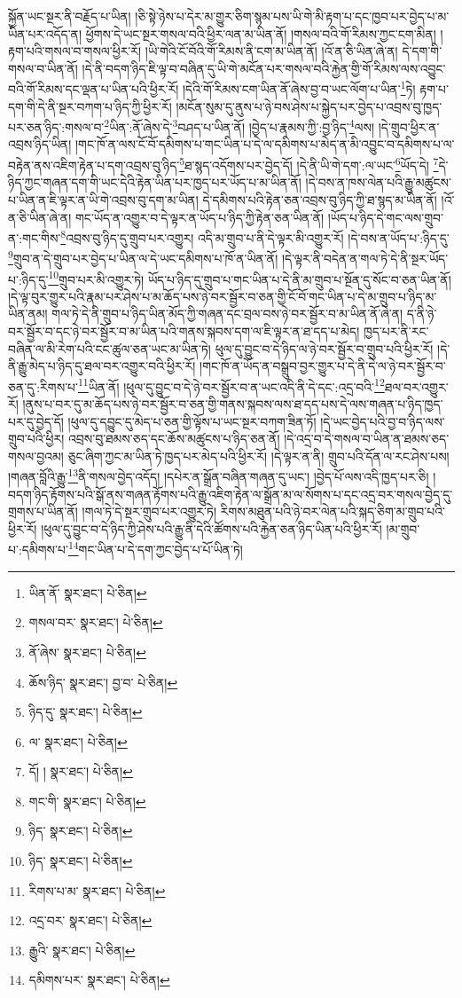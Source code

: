 སྐྱོན་ཡང་སྔར་ནི་བརྗོད་པ་ཡིན། །ཅི་སྟེ་ཉེས་པ་དེར་མ་གྱུར་ཅིག་སྙམ་པས་ཡི་གེ་མི་རྟག་པ་དང་ཁྱབ་པར་བྱེད་པ་མ་ཡིན་པར་འདོད་ན། ཕྱོགས་དེ་ཡང་སྔར་གསལ་བའི་ཕྱིར་ལན་མ་ཡིན་ནོ། །གསལ་བའི་གོ་རིམས་ཀྱང་ངག་མིན། །རྟག་པའི་གསལ་བ་གསལ་ཕྱིར་རོ། །ཡི་གེའི་ངོ་བོའི་གོ་རིམས་ནི་ངག་མ་ཡིན་ནོ། །འོ་ན་ཅི་ཡིན་ཞེ་ན། དེ་དག་གི་གསལ་བ་ཡིན་ནོ། །དེ་ནི་བདག་ཉིད་ཇི་ལྟ་བ་བཞིན་དུ་ཡི་གེ་མངོན་པར་གསལ་བའི་རྐྱེན་གྱི་གོ་རིམས་ལས་འབྱུང་བའི་གོ་རིམས་དང་ལྡན་པ་ཡིན་པའི་ཕྱིར་རོ། །དེའི་གོ་རིམས་ངག་ཡིན་ནོ་ཞེས་བྱ་བ་ཡང་ལོག་པ་ཡིན་\footnote{ཡིན་ནོ་  སྣར་ཐང་།  པེ་ཅིན། }ཏེ། རྟག་པ་དག་གི་དེ་ནི་སྔར་བཀག་པ་ཉིད་ཀྱི་ཕྱིར་རོ། །མངོན་སུམ་དུ་ནུས་པ་ཉེ་བས་ཤེས་པ་སྐྱེད་པར་བྱེད་པ་འབྲས་བུ་ཁྱད་པར་ཅན་ཉིད་:གསལ་བ་\footnote{གསལ་བར་  སྣར་ཐང་།  པེ་ཅིན། }ཡིན་:ནོ་ཞེས་དེ་\footnote{ནོ་ཞེས་  སྣར་ཐང་།  པེ་ཅིན། }བཤད་པ་ཡིན་ནོ། །བྱེད་པ་རྣམས་ཀྱི་:བྱ་ཉིད་\footnote{ཆོས་ཉིད་  སྣར་ཐང་། བྱ་བ་  པེ་ཅིན། }ལས། །དེ་གྲུབ་ཕྱིར་ན་འབྲས་ཉིད་ཡིན། །གང་ཁོ་ན་ལས་ངོ་བོ་དམིགས་པ་གང་ཡིན་པ་དེ་ལ་དམིགས་པ་མེད་ན་མི་འབྱུང་བ་དམིགས་པ་ལ་བརྟེན་ནས་འཇིག་རྟེན་པ་དག་འབྲས་བུ་ཉིད་\footnote{ཉིད་དུ་  སྣར་ཐང་།  པེ་ཅིན། }ཐ་སྙད་འདོགས་པར་བྱེད་དོ། །དེ་ནི་ཡི་གེ་དག་:ལ་ཡང་\footnote{ལ་  སྣར་ཐང་།  པེ་ཅིན། }ཡོད་དེ། \footnote{དོ། །   སྣར་ཐང་།  པེ་ཅིན། }དེ་ཉིད་ཀྱང་གཞན་དག་གི་ཡང་དེའི་རྟེན་ཡིན་པར་ཁྱད་པར་ཡོད་པ་མ་ཡིན་ནོ། །དེ་བས་ན་ཁས་ལེན་པའི་རྒྱུ་མཚུངས་པ་ཡིན་ན་ཇི་ལྟར་ན་ཡི་གེ་འབྲས་བུ་དག་མ་ཡིན། དེ་དམིགས་པའི་རྟེན་ཅན་འབྲས་བུ་ཉིད་ཀྱི་ཐ་སྙད་མ་ཡིན་ནོ། །འོ་ན་ཅི་ཡིན་ཞེ་ན། གང་ཡོད་ན་འགྱུར་བ་དེ་ལྟར་ན་ཡོད་པ་ཉིད་ཀྱི་རྟེན་ཅན་ཡིན་ནོ། །ཡོད་པ་ཉིད་དེ་གང་ལས་གྲུབ་ན་:གང་གིས་\footnote{གང་གི་  སྣར་ཐང་།  པེ་ཅིན། }འབྲས་བུ་ཉིད་དུ་གྲུབ་པར་འགྱུར། འདི་མ་གྲུབ་པ་ནི་དེ་ལྟར་མི་འགྱུར་རོ། །དེ་བས་ན་ཡོད་པ་:ཉིད་དུ་\footnote{ཉིད་  སྣར་ཐང་།  པེ་ཅིན། }གྲུབ་ན་དེ་གྲུབ་པར་བྱེད་པ་ཡིན་ལ་དེ་ཡང་དམིགས་པ་ཁོ་ན་ཡིན་ནོ། །དེ་ལྟར་ནི་བདེན་ན་གལ་ཏེ་དེ་ནི་སྔར་ཡོད་པ་:ཉིད་དུ་\footnote{ཉིད་  སྣར་ཐང་།  པེ་ཅིན། }གྲུབ་པར་མི་འགྱུར་ཏེ། ཡོད་པ་ཉིད་དུ་གྲུབ་པ་གང་ཡིན་པ་དེ་ནི་མ་གྲུབ་པ་སྔོན་དུ་སོང་བ་ཅན་ཡིན་ནོ། །དེ་ལྟ་བུར་གྱུར་པའི་རྣམ་པར་ཤེས་པ་མ་ཆོད་པས་ཉེ་བར་སྦྱོར་བ་ཅན་གྱི་ངོ་བོ་གང་ཡིན་པ་དེ་མ་གྲུབ་པ་ཉིད་མ་ཡིན་ནམ། གལ་ཏེ་དེ་ནི་གྲུབ་པ་ཉིད་ཡིན་མོད་ཀྱི་གཞན་དང་བྲལ་བས་ཉེ་བར་སྦྱོར་བ་མ་ཡིན་ནོ་ཞེ་ན། ད་ནི་ཉེ་བར་སྦྱོར་བ་དང་ཉེ་བར་སྦྱོར་བ་མ་ཡིན་པའི་གནས་སྐབས་དག་ལ་ཇི་ལྟར་ན་ཐ་དད་པ་མེད། ཁྱད་པར་ནི་རང་བཞིན་ལ་མི་རེག་པའི་ངང་ཚུལ་ཅན་ཡང་མ་ཡིན་ཏེ། ཕུལ་དུ་བྱུང་བ་དེ་ཉིད་ལ་ཉེ་བར་སྦྱོར་བ་གྲུབ་པའི་ཕྱིར་རོ། །དེ་ནི་རྒྱུ་མེད་པ་ཉིད་དུ་ཐལ་བར་འགྱུར་བའི་ཕྱིར་རོ། །གང་ཁོ་ན་ཡོད་ན་བསྒྲུབ་བྱར་གྱུར་པ་དེ་ནི་དེ་ལ་ཉེ་བར་སྦྱོར་བ་ཅན་དུ་:རིགས་པ་\footnote{རིགས་པ་མ་  སྣར་ཐང་།  པེ་ཅིན། }ཡིན་ནོ། །ཕུལ་དུ་བྱུང་བ་དེ་ཉེ་བར་སྦྱོར་བ་ན་ཡང་འདི་ནི་དེ་དང་:འདྲ་བའི་\footnote{འདྲ་བར་  སྣར་ཐང་།  པེ་ཅིན། }ཐལ་བར་འགྱུར་རོ། །ནུས་པ་བར་དུ་མ་ཆོད་པས་ཉེ་བར་སྦྱོར་བ་ཅན་གྱི་གནས་སྐབས་ལས་ཐ་དད་པས་དེ་ལས་གཞན་པ་ཉིད་ཁྱད་པར་དུ་བྱེད་དོ། །ཕུལ་དུ་དབྱུང་དུ་མེད་པ་ཅན་གྱི་ལྟོས་པ་ཡང་སྔར་བཀག་ཟིན་ཏོ། །དེ་ཡང་བྱེད་པའི་བྱ་བ་ཉིད་ལས་གྲུབ་པའི་ཕྱིར། འབྲས་བུ་ཐམས་ཅད་དང་ཆོས་མཚུངས་པ་ཉིད་ཅན་ནོ། །དེ་འདྲ་བ་དེ་གསལ་བ་ཡིན་ན་ཐམས་ཅད་གསལ་བྱའམ། ཅུང་ཞིག་ཀྱང་མ་ཡིན་ཏེ་ཁྱད་པར་མེད་པའི་ཕྱིར་རོ། །དེ་ལྟར་ན་ནི། གྲུབ་པའི་དོན་ལ་རང་ཤེས་པས། །གཞན་བློའི་རྒྱུ་\footnote{རྒྱུའི་  སྣར་ཐང་།  པེ་ཅིན། }ནི་གསལ་བྱེད་འདོད། །དཔེར་ན་སྒྲོན་བཞིན་གཞན་དུ་ཡང་། །བྱེད་པོ་ལས་འདི་ཁྱད་པར་ཅི། །བདག་ཉིད་རྟོགས་པའི་སྒོ་ནས་གཞན་རྟོགས་པའི་རྒྱུ་འཇིག་རྟེན་ལ་སྒྲོན་མ་ལ་སོགས་པ་དང་འདྲ་བར་གསལ་བྱེད་དུ་གྲགས་པ་ཡིན་ནོ། །གལ་ཏེ་དེ་སྔར་གྲུབ་པར་འགྱུར་ཏེ། རིགས་མཐུན་པའི་ཉེ་བར་ལེན་པའི་སྐད་ཅིག་མ་གྲུབ་པའི་ཕྱིར་རོ། །ཕུལ་དུ་བྱུང་བ་དེ་ཉིད་ཀྱི་ཤེས་པའི་རྒྱུ་ནི་དེའི་ཚོགས་པའི་རྐྱེན་ཅན་ཉིད་ཡིན་པའི་ཕྱིར་རོ། །མ་གྲུབ་པ་:དམིགས་པ་\footnote{དམིགས་པར་  སྣར་ཐང་།  པེ་ཅིན། }གང་ཡིན་པ་དེ་དག་ཀྱང་བྱེད་པ་པོ་ཡིན་ཏེ། 